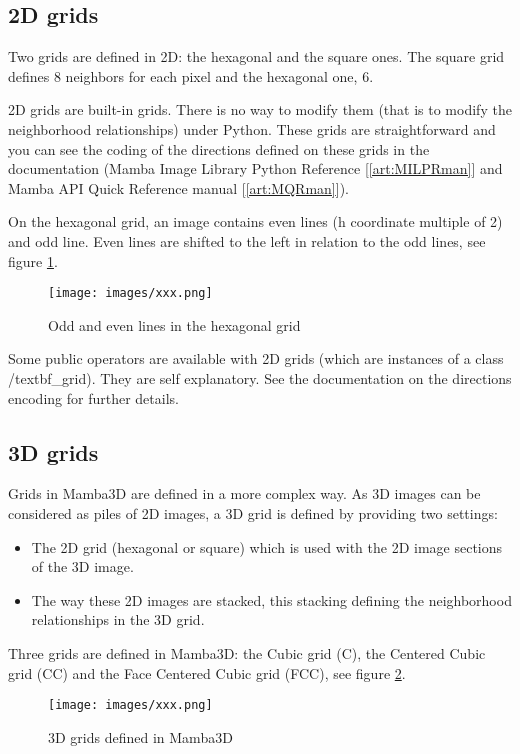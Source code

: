 \documentclass[a4paper,10pt,oneside]{article}
\begin{document}
\subsection{2D grids}
\label{cha:2Dgrids}
Two grids are defined in 2D: the hexagonal and the square ones. 
The square grid defines 8 neighbors for each pixel and the hexagonal one, 6.

2D grids are built-in grids. There is no way to modify them (that is to modify the neighborhood
relationships) under Python. These grids are straightforward and you can see the coding of the directions
defined on these grids in the documentation (Mamba Image Library Python Reference [\ref{art:MILPRman}] and Mamba API
Quick Reference manual [\ref{art:MQRman}]).

On the hexagonal grid, an image contains even lines (h coordinate multiple of 2) and odd line. Even lines
are shifted to the left in relation to the odd lines, see figure \ref{fig:hex_grid}.
 
\begin{figure}
\centering
\texttt{[image: images/xxx.png]}
\caption{Odd and even lines in the hexagonal grid}
\label{fig:hex_grid}
\end{figure}

Some public operators are available with 2D grids (which are instances of a class /textbf{_grid}). They are self
explanatory. See the documentation on the directions encoding for further details.

\subsection{3D grids}
Grids in Mamba3D are defined in a more complex way. As 3D images can be considered as piles of 2D images,
a 3D grid is defined by providing two settings:

\begin{itemize}
\item The 2D grid (hexagonal or square) which is used with the 2D image sections of the 3D image.
\item The way these 2D images are stacked, this stacking defining the neighborhood relationships in the 3D grid.
\end{itemize}

Three grids are defined in Mamba3D: the Cubic grid (C), the Centered Cubic grid (CC) and the Face Centered Cubic grid (FCC),
see figure \ref{fig:3D_grids}.

\begin{figure}
\centering
\texttt{[image: images/xxx.png]}
\caption{3D grids defined in Mamba3D}
\label{fig:3D_grids}
\end{figure}
\end{document}
